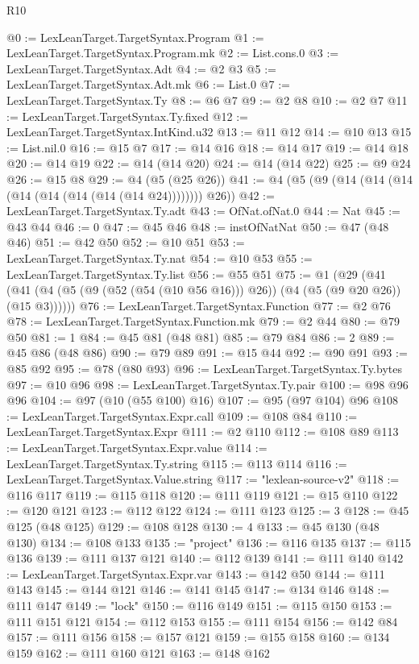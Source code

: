 \begin{lexlean}{R10}
\begin{coremodule}
{{{{{{{{{{{{{{{{{{{{{{{{{{{{{{{{{{{{{{{{{{{{{{{{{{{{{{{{{{{{{{{{{{{{{{{{{{{{{{{{{{{{{{{{{{{{{{{{{{{{{{{{{{{{@0 := LexLeanTarget.TargetSyntax.Program
@1 := LexLeanTarget.TargetSyntax.Program.mk
@2 := List.cons.{0}
@3 := LexLeanTarget.TargetSyntax.Adt
@4 := @2 @3
@5 := LexLeanTarget.TargetSyntax.Adt.mk
@6 := List.{0}
@7 := LexLeanTarget.TargetSyntax.Ty
@8 := @6 @7
@9 := @2 @8
@10 := @2 @7
@11 := LexLeanTarget.TargetSyntax.Ty.fixed
@12 := LexLeanTarget.TargetSyntax.IntKind.u32
@13 := @11 @12
@14 := @10 @13
@15 := List.nil.{0}
@16 := @15 @7
@17 := @14 @16
@18 := @14 @17
@19 := @14 @18
@20 := @14 @19
@22 := @14 (@14 @20)
@24 := @14 (@14 @22)
@25 := @9 @24
@26 := @15 @8
@29 := @4 (@5 (@25 @26))
@41 := @4 (@5 (@9 (@14 (@14 (@14 (@14 (@14 (@14 (@14 (@14 @24)))))))) @26))
@42 := LexLeanTarget.TargetSyntax.Ty.adt
@43 := OfNat.ofNat.{0}
@44 := Nat
@45 := @43 @44
@46 := 0
@47 := @45 @46
@48 := instOfNatNat
@50 := @47 (@48 @46)
@51 := @42 @50
@52 := @10 @51
@53 := LexLeanTarget.TargetSyntax.Ty.nat
@54 := @10 @53
@55 := LexLeanTarget.TargetSyntax.Ty.list
@56 := @55 @51
@75 := @1
    (@29 (@41 (@41 (@4 (@5 (@9 (@52 (@54 (@10 @56 @16))) @26)) (@4 (@5 (@9 @20 @26)) (@15 @3))))))
@76 := LexLeanTarget.TargetSyntax.Function
@77 := @2 @76
@78 := LexLeanTarget.TargetSyntax.Function.mk
@79 := @2 @44
@80 := @79 @50
@81 := 1
@84 := @45 @81 (@48 @81)
@85 := @79 @84
@86 := 2
@89 := @45 @86 (@48 @86)
@90 := @79 @89
@91 := @15 @44
@92 := @90 @91
@93 := @85 @92
@95 := @78 (@80 @93)
@96 := LexLeanTarget.TargetSyntax.Ty.bytes
@97 := @10 @96
@98 := LexLeanTarget.TargetSyntax.Ty.pair
@100 := @98 @96 @96
@104 := @97 (@10 (@55 @100) @16)
@107 := @95 (@97 @104) @96
@108 := LexLeanTarget.TargetSyntax.Expr.call
@109 := @108 @84
@110 := LexLeanTarget.TargetSyntax.Expr
@111 := @2 @110
@112 := @108 @89
@113 := LexLeanTarget.TargetSyntax.Expr.value
@114 := LexLeanTarget.TargetSyntax.Ty.string
@115 := @113 @114
@116 := LexLeanTarget.TargetSyntax.Value.string
@117 := "lexlean-source-v2"
@118 := @116 @117
@119 := @115 @118
@120 := @111 @119
@121 := @15 @110
@122 := @120 @121
@123 := @112 @122
@124 := @111 @123
@125 := 3
@128 := @45 @125 (@48 @125)
@129 := @108 @128
@130 := 4
@133 := @45 @130 (@48 @130)
@134 := @108 @133
@135 := "project"
@136 := @116 @135
@137 := @115 @136
@139 := @111 @137 @121
@140 := @112 @139
@141 := @111 @140
@142 := LexLeanTarget.TargetSyntax.Expr.var
@143 := @142 @50
@144 := @111 @143
@145 := @144 @121
@146 := @141 @145
@147 := @134 @146
@148 := @111 @147
@149 := "lock"
@150 := @116 @149
@151 := @115 @150
@153 := @111 @151 @121
@154 := @112 @153
@155 := @111 @154
@156 := @142 @84
@157 := @111 @156
@158 := @157 @121
@159 := @155 @158
@160 := @134 @159
@162 := @111 @160 @121
@163 := @148 @162
}}}}}}}}}}}}}}}}}}}}}}}}}}}}}}}}}}}}}}}}}}}}}}}}}}}}}}}}}}}}}}}}}}}}}}}}}}}}}}}}}}}}}}}}}}}}}}}}}}}}}}}}}}}}
\end{coremodule}
\end{lexlean}
